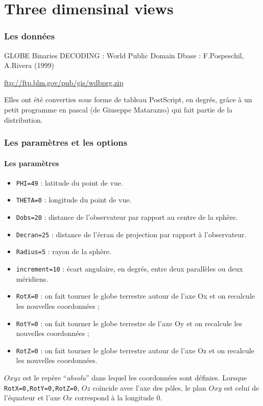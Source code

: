 \documentclass[11pt,french,BCOR10mm,DIV12,bibliography=totoc,parskip=false,
   smallheadings, headexclude,footexclude,oneside]{pst-doc}
\let\Parameter\texttt
\begin{document}
\part{Three dimensinal views}
\newcommand\PstMapThreeDPackage{\textsf{pst-geo}}


 \section{Les données\label{datas}}
GLOBE Binaries DECODING : World Public Domain Dbase :
 F.Pospeschil, A.Rivera (1999)

\url{ftp://ftp.blm.gov/pub/gis/wdbprg.zip}

Elles ont \'et\'e converties sous forme de tableau PostScript, en
degr\'es,
gr\^ ace à un petit programme en pascal (de Giuseppe Matarazzo) qui
fait partie de la distribution.
\section{Les paramètres et les options}
\subsection{Les paramètres}
\begin{itemize}
\item \Parameter{PHI=49} : latitude du point de vue.
\item \Parameter{THETA=0} : longitude du point de vue.
\item \Parameter{Dobs=20} : distance de l'observateur par rapport au centre de la sphère.
\item \Parameter{Decran=25} : distance de l'écran de projection par rapport à l'observateur.
\item \Parameter{Radius=5} : rayon de la sphère.
\item \Parameter{increment=10} : écart angulaire, en degrés, entre deux
parallèles ou deux méridiens.
\item \Parameter{RotX=0} : on fait tourner le globe terrestre autour de l'axe
\textsf{Ox} et on recalcule les nouvelles coordonnées ;
\item \Parameter{RotY=0} : on fait tourner le globe terrestre de l'axe
\textsf{Oy} et on recalcule les nouvelles coordonnées ;
\item \Parameter{RotZ=0} : on fait tourner le globe terrestre autour de l'axe
\textsf{Oz} et on recalcule les nouvelles coordonnées.
\end{itemize}
$Oxyz$ est le repère ``\textit{absolu}'' dans lequel les coordonnées sont
définies. Lorsque \Parameter{RotX=0,RotY=0,RotZ=0}, $Oz$ coïncide avec l'axe des
pôles, le plan $Oxy$ est celui de l'équateur et l'axe $Ox$ correspond à
la longitude 0.
\end{document}
